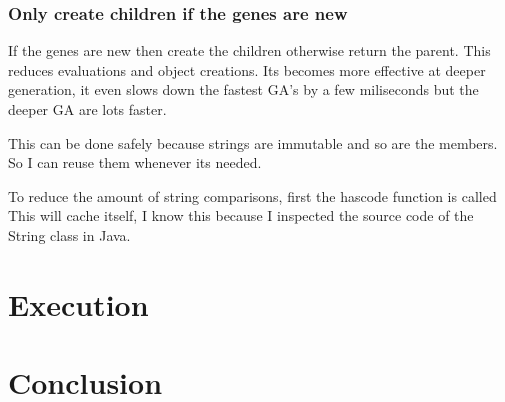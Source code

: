 \documentclass{article}
\begin{document}
\subsubsection{Only create children if the genes are new}
If the genes are new then create the children otherwise return the parent.
This reduces evaluations and object creations. Its becomes more effective
at deeper generation, it even slows down the fastest GA's by a few miliseconds
but the deeper GA are lots faster.

This can be done safely because strings are immutable and so are the members.
So I can reuse them whenever its needed.

To reduce the amount of string comparisons, first the hascode function is called
This will cache itself, I know this because I inspected the source code of the
String class in Java.
\section{Execution}



\section{Conclusion}
\end{document}

